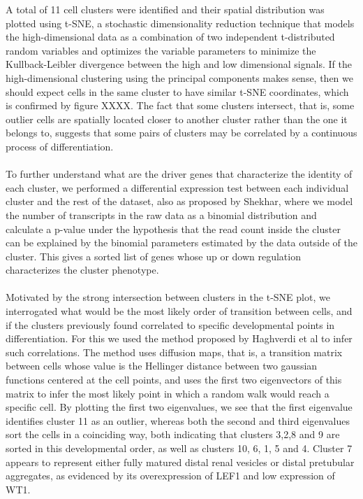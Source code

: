 \documentclass[11pt]{article}
\begin{document}
A total of 11 cell clusters were identified and their spatial distribution was plotted using t-SNE, a stochastic dimensionality reduction technique that models the high-dimensional data as a combination of two independent t-distributed random variables and optimizes the variable parameters to minimize the Kullback-Leibler divergence between the high and low dimensional signals. If the high-dimensional clustering using the principal components makes sense, then we should expect cells in the same cluster to have similar t-SNE coordinates, which is confirmed by figure XXXX. The fact that some clusters intersect, that is, some outlier cells are spatially located closer to another cluster rather than the one it belongs to, suggests that some pairs of clusters may be correlated by a continuous process of differentiation. \\
\\
To further understand what are the driver genes that characterize the identity of each cluster, we performed a differential expression test between each individual cluster and the rest of the dataset, also as proposed by Shekhar, where we model the number of transcripts in the raw data as a binomial distribution and calculate a p-value under the hypothesis that the read count inside the cluster can be explained by the binomial parameters estimated by the data outside of the cluster. This gives a sorted list of genes whose up or down regulation characterizes the cluster phenotype. \\
\\
Motivated by the strong intersection between clusters in the t-SNE plot, we interrogated what would be the most likely order of transition between cells, and if the clusters previously found correlated to specific developmental points in differentiation. For this we used the method proposed by Haghverdi et al to infer such correlations. The method uses diffusion maps, that is, a transition matrix between cells whose value is the Hellinger distance between two gaussian functions centered at the cell points, and uses the first two eigenvectors of this matrix to infer the most likely point in which a random walk would reach a specific cell. By plotting the first two eigenvalues, we see that the first eigenvalue identifies cluster 11 as an outlier, whereas both the second and third eigenvalues sort the cells in a coinciding way, both indicating that clusters 3,2,8 and 9 are sorted in this developmental order, as well as clusters 10, 6, 1, 5 and 4. Cluster 7 appears to represent either fully matured distal renal vesicles or distal pretubular aggregates, as evidenced by its overexpression of LEF1 and low expression of WT1. \\
\\




\end{document}
